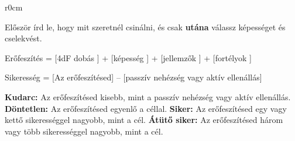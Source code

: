 {
\begin{wraptable}{r}{0cm}
\end{wraptable}


Először írd le, hogy mit szeretnél csinálni, és csak \textbf{utána} válassz képességet és cselekvést.


Erőfeszítés = [4dF dobás ] + [képesség ] + [jellemzők ] + [fortélyok ]


Sikeresség = [Az erőfeszítésed] -- [passzív nehézség vagy aktív ellenállás]

\begin{itemize}
    \failureitem \textbf{Kudarc:} Az erőfeszítésed kisebb, mint a passzív nehézség vagy aktív ellenállás.
    \tieitem \textbf{Döntetlen:} Az erőfeszítésed egyenlő a céllal.
    \successitem \textbf{Siker:} Az erőfeszítésed egy vagy kettő sikerességgel nagyobb, mint a cél.
    \successwithstyleitem \textbf{Átütő siker:} Az erőfeszítésed három vagy több sikerességgel nagyobb, mint a cél.
\end{itemize}
}

\vspace{5pt}

